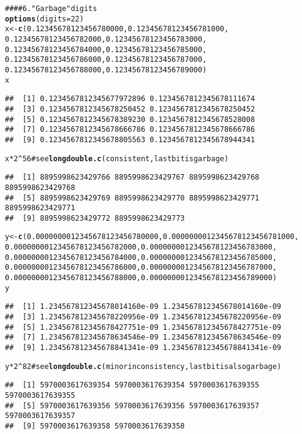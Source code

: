 \documentclass{article}\usepackage{graphicx, color}
\makeatletter
\newcommand{\hlfunctioncall}[1]{\textcolor[rgb]{0.501960784313725,0,0.329411764705882}{\textbf{#1}}}%
\newcommand{\hlstring}[1]{\textcolor[rgb]{0.6,0.6,1}{#1}}%
\newcommand{\hlcomment}[1]{\textcolor[rgb]{0.180392156862745,0.6,0.341176470588235}{#1}}%
\newenvironment{kframe}{%
 \def\at@end@of@kframe{}%
 \ifinner\ifhmode%
  \def\at@end@of@kframe{\end{minipage}}%
  \begin{minipage}{\columnwidth}%
 \fi\fi%
 \def\FrameCommand##1{\hskip\@totalleftmargin \hskip-\fboxsep
 \colorbox{shadecolor}{##1}\hskip-\fboxsep
     \hskip-\linewidth \hskip-\@totalleftmargin \hskip\columnwidth}%
 \MakeFramed {\advance\hsize-\width
   \@totalleftmargin\z@ \linewidth\hsize
   \@setminipage}}%
 {\par\unskip\endMakeFramed%
 \at@end@of@kframe}
\newenvironment{knitrout}{}{} %
\makeatother
\begin{document}
\begin{knitrout}
\color{fgcolor}\begin{kframe}
\begin{alltt}
#### 6. \hlstring{"Garbage"} digits
\hlfunctioncall{options}(digits = 22)
x <- \hlfunctioncall{c}(0.12345678123456780000, 0.12345678123456781000,
       0.12345678123456782000, 0.12345678123456783000,
       0.12345678123456784000, 0.12345678123456785000,
       0.12345678123456786000, 0.12345678123456787000,
       0.12345678123456788000, 0.12345678123456789000)
x
\end{alltt}
\begin{verbatim}
##  [1] 0.1234567812345677972896 0.1234567812345678111674
##  [3] 0.1234567812345678250452 0.1234567812345678250452
##  [5] 0.1234567812345678389230 0.1234567812345678528008
##  [7] 0.1234567812345678666786 0.1234567812345678666786
##  [9] 0.1234567812345678805563 0.1234567812345678944341
\end{verbatim}
\begin{alltt}
x*2^56 \hlcomment{# see \hlfunctioncall{longdouble.c} (consistent, last bit is garbage)}
\end{alltt}
\begin{verbatim}
##  [1] 8895998623429766 8895998623429767 8895998623429768 8895998623429768
##  [5] 8895998623429769 8895998623429770 8895998623429771 8895998623429771
##  [9] 8895998623429772 8895998623429773
\end{verbatim}
\begin{alltt}

y <- \hlfunctioncall{c}(0.0000000012345678123456780000, 0.0000000012345678123456781000,
       0.0000000012345678123456782000, 0.0000000012345678123456783000,
       0.0000000012345678123456784000, 0.0000000012345678123456785000,
       0.0000000012345678123456786000, 0.0000000012345678123456787000,
       0.0000000012345678123456788000, 0.0000000012345678123456789000)
y
\end{alltt}
\begin{verbatim}
##  [1] 1.234567812345678014160e-09 1.234567812345678014160e-09
##  [3] 1.234567812345678220956e-09 1.234567812345678220956e-09
##  [5] 1.234567812345678427751e-09 1.234567812345678427751e-09
##  [7] 1.234567812345678634546e-09 1.234567812345678634546e-09
##  [9] 1.234567812345678841341e-09 1.234567812345678841341e-09
\end{verbatim}
\begin{alltt}
y*2^82 \hlcomment{# see \hlfunctioncall{longdouble.c} (minor inconsistency, last bit is also garbage)}
\end{alltt}
\begin{verbatim}
##  [1] 5970003617639354 5970003617639354 5970003617639355 5970003617639355
##  [5] 5970003617639356 5970003617639356 5970003617639357 5970003617639357
##  [9] 5970003617639358 5970003617639358
\end{verbatim}
\begin{alltt}

\end{alltt}
\end{kframe}
\end{knitrout}
\end{document}
